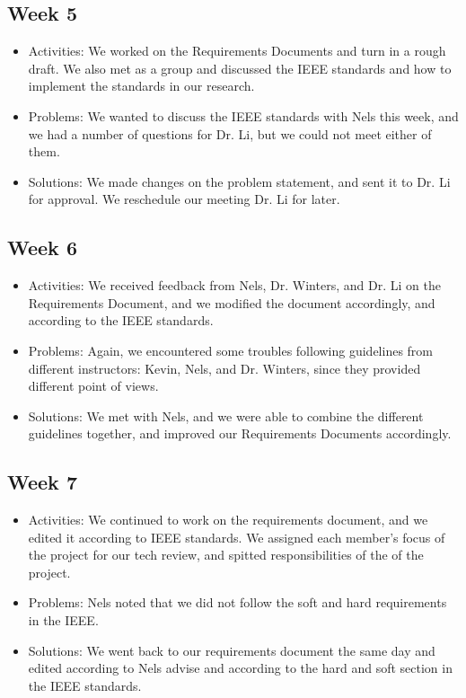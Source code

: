 \documentclass[10pt,draftclsnofoot,onecolumn,journal,compsoc]{IEEEtran}
\begin{document}
\subsection{Week 5}
\begin{itemize}
\item Activities: We worked on the Requirements Documents and turn in a rough draft. We also met as a group and discussed the IEEE standards and how to implement the standards in our research.
\item Problems: 
We wanted to discuss the IEEE standards with Nels this week, and we had a number of questions for Dr. Li, but we could not meet either of them.
\item Solutions: 
We made changes on the problem statement, and sent it to Dr. Li for approval. We reschedule our meeting Dr. Li for later. 
\end{itemize}

\subsection{Week 6}
\begin{itemize}
\item Activities: 
We received feedback from Nels, Dr. Winters, and Dr. Li on the Requirements Document, and we modified the document accordingly, and according to the IEEE standards.
\item Problems: 
Again, we encountered some troubles following guidelines from different instructors: Kevin, Nels, and Dr. Winters, since they provided different point of views.
\item Solutions: 
We met with Nels, and we were able to combine the different guidelines together, and improved our Requirements Documents accordingly.
\end{itemize}

\subsection{Week 7}
\begin{itemize}
\item Activities: 
We continued to work on the requirements document, and we edited it according to IEEE standards. We assigned each member's focus of the project for our tech review, and spitted responsibilities of the of the project.
\item Problems: 
Nels noted that we did not follow the soft and hard requirements in the IEEE.
\item Solutions: 
We went back to our requirements document the same day and edited according to Nels advise and according to the hard and soft section in the IEEE standards.
\end{itemize}
\end{document}
